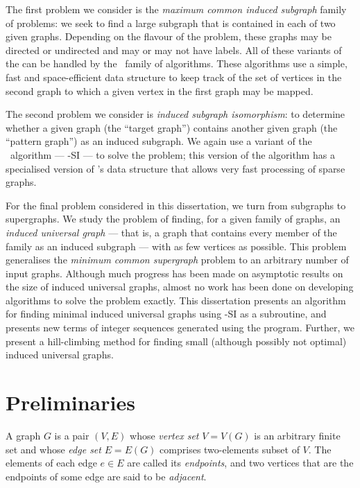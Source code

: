 The first problem we consider is the \emph{maximum common induced subgraph}
family of problems: we seek to find a large subgraph that is
contained in each of two given graphs.
Depending on the flavour of the problem, these
graphs may be directed or undirected and may or may not have labels.
All of these variants of the can be handled by the \McSplit\ family of algorithms.
These algorithms use a simple, fast and space-efficient data structure to keep
track of the set of vertices in the second graph to which a given vertex
in the first graph may be mapped.

The second problem we consider is \emph{induced subgraph isomorphism}: to determine
whether a given graph (the ``target graph'') contains another given graph (the ``pattern graph'')
as an induced subgraph.  We again use a variant of the \McSplit\ algorithm ---
\McSplit-SI --- to solve the problem; this version of the algorithm has a specialised
version of \McSplit's data structure that allows very fast processing of sparse graphs.

For the final problem considered in this dissertation, we turn from subgraphs
to supergraphs.  We study the problem of finding, for a given family of graphs,
an \textit{induced universal graph} --- that is, a graph that contains every
member of the family as an induced subgraph --- with as few vertices as
possible.  This problem generalises the \textit{minimum common supergraph}
problem to an arbitrary number of input graphs.  Although much progress has
been made on asymptotic results on the size of induced universal graphs, almost no
work has been done on developing algorithms to solve the problem exactly.  This
dissertation presents an algorithm for finding minimal induced universal graphs
using \McSplit-SI as a subroutine, and presents new terms of integer sequences
generated using the program.  Further, we present a hill-climbing method for
finding small (although possibly not optimal) induced universal graphs.

\section{Preliminaries}

A graph $G$ is a pair $(V, E)$ whose \emph{vertex set} $V = V(G)$
is an arbitrary finite set and whose \emph{edge set} $E = E(G)$
comprises two-elements subset of $V$. The elements of each edge
$e \in E$ are called its \emph{endpoints}, and two vertices that
are the endpoints of some edge are said to be \emph{adjacent}.

